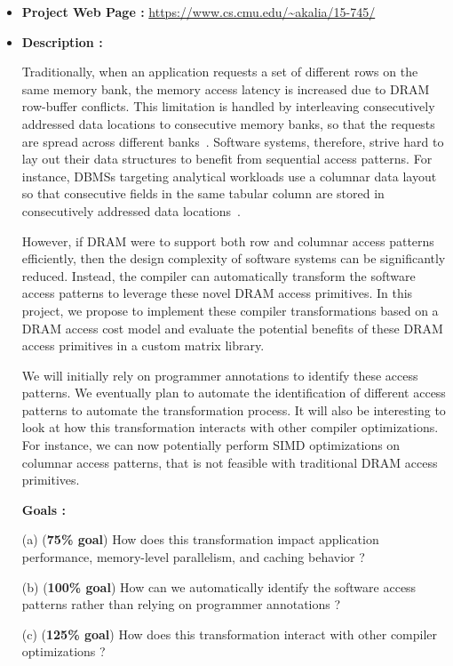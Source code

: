 \documentclass[letterpaper]{article}
\begin{document}
\begin{itemize}

\item \textbf{Project Web Page :} \url{https://www.cs.cmu.edu/~akalia/15-745/}

\item \textbf{Description :} 

Traditionally, when an application requests a set of different rows 
on the same memory bank, the memory access latency is increased due
to DRAM row-buffer conflicts.
This limitation is handled by interleaving consecutively 
addressed data locations to consecutive memory banks, so that
the requests are spread across different banks~\cite{dram1}.
Software systems, therefore, strive hard to lay out their data structures 
to benefit from sequential access patterns. 
For instance, DBMSs targeting analytical workloads use a columnar data 
layout so that consecutive fields in the same tabular column are stored in
consecutively addressed data locations~\cite{col1}.

However, if DRAM were to support both row and columnar access patterns
efficiently, then the design complexity of software systems can be significantly 
reduced. Instead, the compiler can automatically transform the software access
patterns to leverage these novel DRAM access primitives. 
In this project, we propose to implement these compiler transformations based
on a DRAM access cost model and evaluate the potential benefits of these DRAM
access primitives in a custom matrix library. 

We will initially rely on programmer annotations to identify these access
patterns.
We eventually plan to automate the identification of different access patterns
to automate the transformation process.
It will also be interesting to look at how this transformation interacts with
other compiler optimizations. For instance, we can now potentially perform
SIMD optimizations on columnar access patterns, that is not feasible with
traditional DRAM access primitives.

\textbf{Goals :}

(a) (\textbf{75\% goal}) How does this transformation impact application
performance, memory-level parallelism, and caching behavior ? 

(b) (\textbf{100\% goal}) How can we automatically identify the software access
patterns rather than relying on programmer annotations ?

(c) (\textbf{125\% goal}) How does this transformation interact with other
compiler optimizations ?

\end{itemize}
\end{document}

